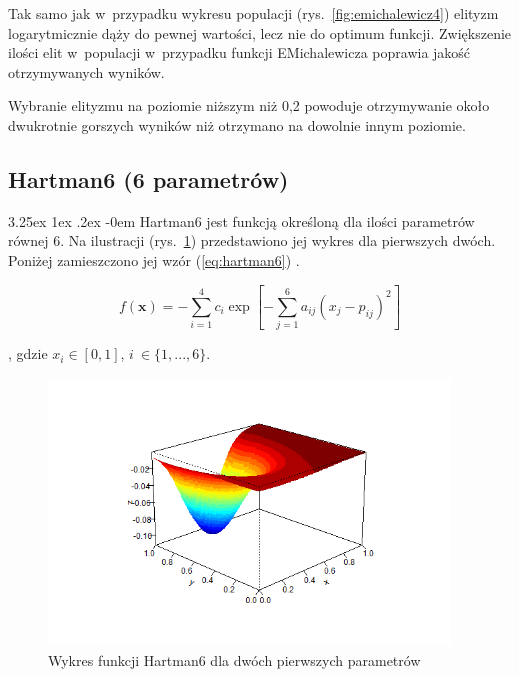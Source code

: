 \documentclass[11pt, a4paper]{article}
\makeatletter
\newcommand{\fbi}{\leavevmode{\parindent=1em\indent}}
\renewcommand\paragraph{\@startsection{paragraph}{5}{\z@}
  {3.25ex \@plus1ex \@minus.2ex}
  {-0em}
  {\normalfont\normalsize\bfseries}}
\makeatother
\begin{document}
\fbi
Tak samo jak w~przypadku wykresu populacji (rys.~\ref{fig:emichalewicz4}) elityzm logarytmicznie dąży do pewnej wartości, lecz nie do optimum funkcji. Zwiększenie ilości elit w~populacji w~przypadku funkcji EMichalewicza poprawia jakość otrzymywanych wyników.

\fbi
Wybranie elityzmu na poziomie niższym niż 0,2 powoduje otrzymywanie około dwukrotnie gorszych wyników niż otrzymano na dowolnie innym poziomie.

\newpage
\subsection{Hartman6 (6 parametrów)}
\paragraph{}
Hartman6 jest funkcją określoną dla ilości parametrów równej 6. Na ilustracji (rys.~\ref{fig:hartman61}) przedstawiono jej wykres dla pierwszych dwóch. Poniżej zamieszczono jej wzór (\ref{eq:hartman6}) \cite{test4}.

\begin{equation}\label{eq:hartman6}
f(\boldsymbol{x}) = - \sum_{i=1}^{4} c_i \exp[- \sum_{j=1}^{6} a_{ij}(x_j - p_{ij})^2]
\end{equation}

, gdzie $ x_i \in [0, 1] $, $ i~\in \{1, ..., 6\} $.

\begin{figure}[H]
	\begin{center}
		\includegraphics[width=0.95\textwidth]{./assets/Hartman61.png}
		\caption{Wykres funkcji Hartman6 dla dwóch pierwszych parametrów}
		\label{fig:hartman61}
	\end{center}
\end{figure}
\end{document}
